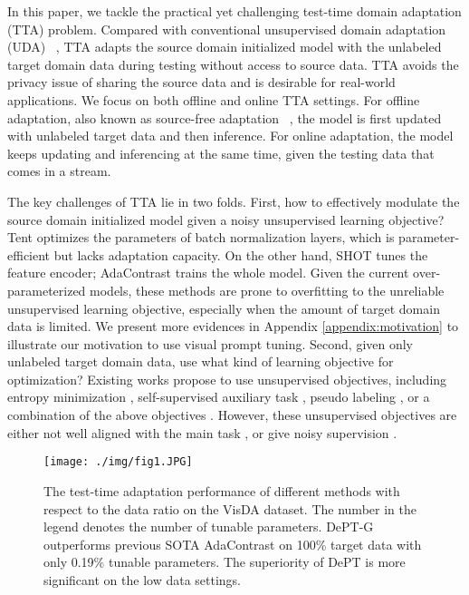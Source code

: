 \documentclass{article} \usepackage{iclr2023_conference,times}
\begin{document}
In this paper, we tackle the practical yet challenging test-time domain adaptation (TTA) problem. Compared with conventional unsupervised domain adaptation (UDA) ~\citep{long2015learning}, TTA adapts the source domain initialized model with the unlabeled target domain data during testing without access to source data. TTA avoids the privacy issue of sharing the source data and is desirable for real-world applications. We focus on both offline and online TTA settings. For offline adaptation, also known as source-free adaptation ~\citep{kundu2020universal,liang2020we}, the model is first updated with unlabeled target data and then inference. For online adaptation, the model keeps updating and inferencing at the same time, given the testing data that comes in a stream. 


The key challenges of TTA lie in two folds. First, how to effectively modulate the source domain initialized model given a noisy unsupervised learning objective? Tent \citep{wang2020tent} optimizes the parameters of batch normalization layers, which is parameter-efficient but lacks adaptation capacity. On the other hand, SHOT \citep{liang2020we} tunes the feature encoder; AdaContrast \citep{chen2022contrastive} trains the whole model. Given the current over-parameterized models, these methods are prone to overfitting to the unreliable unsupervised learning objective, especially when the amount of target domain data is limited. We present more evidences in Appendix \ref{appendix:motivation} to illustrate our motivation to use visual prompt tuning.
Second, given only unlabeled target domain data, use what kind of learning objective for optimization? Existing works propose to use unsupervised objectives, including entropy minimization \citep{wang2020tent}, self-supervised auxiliary task \citep{sun2019test}, pseudo labeling \citep{lee2013pseudo}, or a combination of the above objectives \citep{liang2020we,chen2022contrastive,liu2021ttt++}. However, these unsupervised objectives are either not well aligned with the main task \citep{liu2021ttt++}, or give noisy supervision \citep{liang2020we}.


\begin{wrapfigure}{t}{6cm}
\begin{center}
\texttt{[image: ./img/fig1.JPG]}
\end{center}
\caption{The test-time adaptation performance of different methods with respect to the data ratio on the VisDA dataset. The number in the legend denotes the number of tunable parameters. DePT-G outperforms previous SOTA AdaContrast on 100\% target data with only 0.19\% tunable parameters. The superiority of DePT is more significant on the low data settings.   }
\label{fig:fig1}
\end{wrapfigure}
\end{document}
